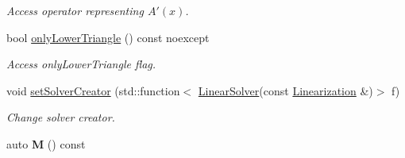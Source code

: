 \begin{DoxyCompactItemize}
\begin{DoxyCompactList}\small\item\em Access operator representing $A'(x)$. \end{DoxyCompactList}\item 
bool \hyperlink{classSpacy_1_1Kaskade_1_1DynamicC1Operator_a790124ad6b035750e819cdc0718e9af3_a790124ad6b035750e819cdc0718e9af3}{only\+Lower\+Triangle} () const noexcept
\begin{DoxyCompactList}\small\item\em Access only\+Lower\+Triangle flag. \end{DoxyCompactList}\item 
void \hyperlink{classSpacy_1_1Kaskade_1_1DynamicC1Operator_a4a440be1a20133c2d7cb8c6382656172_a4a440be1a20133c2d7cb8c6382656172}{set\+Solver\+Creator} (std\+::function$<$ \hyperlink{namespaceSpacy_a7d5cd1c6fb9dd85aa345b536caf30bba_a7d5cd1c6fb9dd85aa345b536caf30bba}{Linear\+Solver}(const \hyperlink{classSpacy_1_1Kaskade_1_1LinearOperator}{Linearization} \&)$>$ f)
\begin{DoxyCompactList}\small\item\em Change solver creator. \end{DoxyCompactList}\item 
\hypertarget{classSpacy_1_1Kaskade_1_1DynamicC1Operator_a197de5e4e1bfbdd4759be55afcdb8090}{}auto {\bfseries M} () const \label{classSpacy_1_1Kaskade_1_1DynamicC1Operator_a197de5e4e1bfbdd4759be55afcdb8090}


\end{DoxyCompactItemize}
